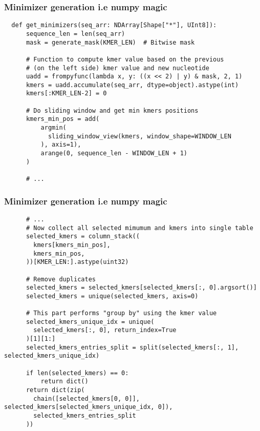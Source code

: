 \begin{frame}[fragile]
  \frametitle{Minimizer generation i.e numpy magic}

  \begin{verbatim}
  def get_minimizers(seq_arr: NDArray[Shape["*"], UInt8]): 
      sequence_len = len(seq_arr)
      mask = generate_mask(KMER_LEN)  # Bitwise mask

      # Function to compute kmer value based on the previous
      # (on the left side) kmer value and new nucleotide
      uadd = frompyfunc(lambda x, y: ((x << 2) | y) & mask, 2, 1)
      kmers = uadd.accumulate(seq_arr, dtype=object).astype(int)
      kmers[:KMER_LEN-2] = 0
      
      # Do sliding window and get min kmers positions
      kmers_min_pos = add(
          argmin(
            sliding_window_view(kmers, window_shape=WINDOW_LEN
          ), axis=1),
          arange(0, sequence_len - WINDOW_LEN + 1)
      )
      
      # ...
  \end{verbatim}
\end{frame}

\begin{frame}[fragile]
  \frametitle{Minimizer generation i.e numpy magic}

  \begin{verbatim}
      # ...
      # Now collect all selected mimumum and kmers into single table
      selected_kmers = column_stack((
        kmers[kmers_min_pos],
        kmers_min_pos,
      ))[KMER_LEN:].astype(uint32)

      # Remove duplicates
      selected_kmers = selected_kmers[selected_kmers[:, 0].argsort()]
      selected_kmers = unique(selected_kmers, axis=0)

      # This part performs "group by" using the kmer value
      selected_kmers_unique_idx = unique(
        selected_kmers[:, 0], return_index=True
      )[1][1:]
      selected_kmers_entries_split = split(selected_kmers[:, 1], selected_kmers_unique_idx)

      if len(selected_kmers) == 0:
          return dict()
      return dict(zip(
        chain([selected_kmers[0, 0]], selected_kmers[selected_kmers_unique_idx, 0]),
        selected_kmers_entries_split
      ))
  \end{verbatim}
\end{frame}

